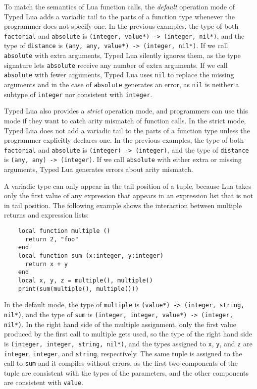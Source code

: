 To match the semantics of Lua function calls, the \emph{default} operation
mode of Typed Lua adds a variadic tail to the parts of a function
type whenever the programmer does not specify one.
In the previous examples, the type of both \texttt{factorial} and
\texttt{absolute} is \texttt{(integer, value*) -> (integer, nil*)},
and the type of \texttt{distance} is \texttt{(any, any, value*) -> (integer, nil*)}.
If we call \texttt{absolute} with extra arguments, Typed Lua silently ignores
them, as the type signature lets \texttt{absolute} receive any number of
extra arguments.
If we call \texttt{absolute} with fewer arguments, Typed Lua uses \texttt{nil} to
replace the missing arguments and in the case of \texttt{absolute} generates
an error, as \texttt{nil} is neither a subtype of \texttt{integer} nor consistent
with \texttt{integer}.

Typed Lua also provides a \emph{strict} operation mode, and programmers can
use this mode if they want to catch arity mismatch of function calls.
In the strict mode, Typed Lua does not add a variadic tail to the
parts of a function type unless the programmer explicitly declares one.
In the previous examples, the type of both \texttt{factorial} and
\texttt{absolute} is \texttt{(integer) -> (integer)},
and the type of \texttt{distance} is \texttt{(any, any) -> (integer)}.
If we call \texttt{absolute} with either extra or missing arguments,
Typed Lua generates errors about arity mismatch.

A variadic type can only appear in the tail position of a tuple,
because Lua takes only the first value of any expression that appears
in an expression list that is not in tail position.
The following example shows the interaction between multiple returns
and expression lists:
\begin{verbatim}
    local function multiple ()
      return 2, "foo"
    end
    local function sum (x:integer, y:integer)
      return x + y
    end
    local x, y, z = multiple(), multiple()
    print(sum(multiple(), multiple()))
\end{verbatim}

In the default mode, the type of \texttt{multiple} is
\texttt{(value*) -> (integer, string, nil*)},
and the type of \texttt{sum} is \texttt{(integer, integer, value*) -> (integer, nil*)}.
In the right hand side of the multiple assignment, only the first
value produced by the first call to multiple gets used,
so the type of the right hand side is
\texttt{(integer, integer, string, nil*)},
and the types assigned to \texttt{x}, \texttt{y}, and \texttt{z}
are \texttt{integer}, \texttt{integer}, and \texttt{string}, respectively.
The same tuple is assigned to the call to \texttt{sum} and it
compiles without errors, as the first two components of the tuple
are consistent with the types of the parameters, and the other
components are consistent with \texttt{value}.

